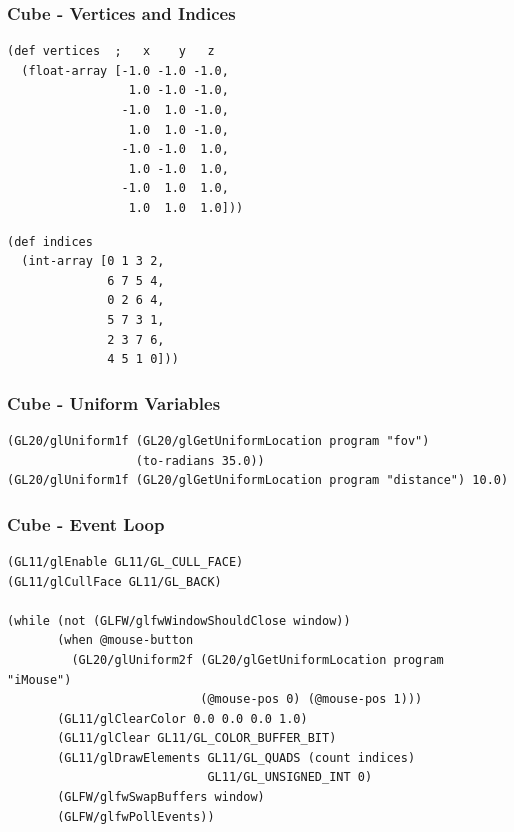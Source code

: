 \documentclass[aspectratio=169,11pt,xcolor=dvipsnames]{beamer}
\begin{document}
\begin{frame}[fragile]
  \frametitle{Cube {-} Vertices and Indices}
  \begin{minipage}[t]{.48\textwidth}
    \begin{verbatim}
(def vertices  ;   x    y   z
  (float-array [-1.0 -1.0 -1.0,
                 1.0 -1.0 -1.0,
                -1.0  1.0 -1.0,
                 1.0  1.0 -1.0,
                -1.0 -1.0  1.0,
                 1.0 -1.0  1.0,
                -1.0  1.0  1.0,
                 1.0  1.0  1.0]))
    \end{verbatim}
  \end{minipage}
  \begin{minipage}[t]{.48\textwidth}
    \begin{verbatim}
(def indices
  (int-array [0 1 3 2,
              6 7 5 4,
              0 2 6 4,
              5 7 3 1,
              2 3 7 6,
              4 5 1 0]))
    \end{verbatim}
  \end{minipage}
\end{frame}

\begin{frame}[fragile]
  \frametitle{Cube {-} Uniform Variables}
  \begin{verbatim}
(GL20/glUniform1f (GL20/glGetUniformLocation program "fov")
                  (to-radians 35.0))
(GL20/glUniform1f (GL20/glGetUniformLocation program "distance") 10.0)
  \end{verbatim}
\end{frame}

\begin{frame}[fragile]
  \frametitle{Cube {-} Event Loop}
  \begin{verbatim}
(GL11/glEnable GL11/GL_CULL_FACE)
(GL11/glCullFace GL11/GL_BACK)

(while (not (GLFW/glfwWindowShouldClose window))
       (when @mouse-button
         (GL20/glUniform2f (GL20/glGetUniformLocation program "iMouse")
                           (@mouse-pos 0) (@mouse-pos 1)))
       (GL11/glClearColor 0.0 0.0 0.0 1.0)
       (GL11/glClear GL11/GL_COLOR_BUFFER_BIT)
       (GL11/glDrawElements GL11/GL_QUADS (count indices)
                            GL11/GL_UNSIGNED_INT 0)
       (GLFW/glfwSwapBuffers window)
       (GLFW/glfwPollEvents))
  \end{verbatim}
\end{frame}
\end{document}
